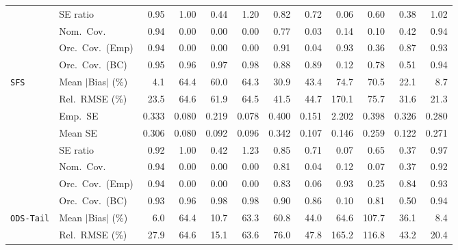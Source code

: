 \begin{landscape}
\begin{longtable}{llrrrrrrrrrr}
 & SE ratio & \cellcolor{rankthree}0.95 & \cellcolor{rankone}1.00 & 0.44 & 1.20 & 0.82 & 0.72 & 0.06 & 0.60 & 0.38 & \cellcolor{ranktwo}1.02 \\
 & Nom.\ Cov. & \cellcolor{rankone}0.94 & 0.00 & 0.00 & 0.00 & \cellcolor{ranktwo}0.77 & 0.03 & 0.14 & 0.10 & \cellcolor{rankthree}0.42 & \cellcolor{rankone}0.94 \\
 & Orc.\ Cov.\ (Emp) & \cellcolor{rankone}0.94 & 0.00 & 0.00 & 0.00 & \cellcolor{rankthree}0.91 & 0.04 & \cellcolor{ranktwo}0.93 & 0.36 & 0.87 & \cellcolor{ranktwo}0.93 \\
 & Orc.\ Cov.\ (BC) & \cellcolor{rankone}0.95 & \cellcolor{ranktwo}0.96 & \cellcolor{rankthree}0.97 & 0.98 & 0.88 & 0.89 & 0.12 & 0.78 & 0.51 & \cellcolor{ranktwo}0.94 \\
\addlinespace[2pt]
\quad \texttt{SFS} & Mean $|$Bias$|$ (\%) & \cellcolor{rankone}4.1 & 64.4 & 60.0 & 64.3 & 30.9 & 43.4 & 74.7 & 70.5 & \cellcolor{rankthree}22.1 & \cellcolor{ranktwo}8.7 \\
 & Rel.\ RMSE (\%) & \cellcolor{ranktwo}23.5 & 64.6 & 61.9 & 64.5 & 41.5 & 44.7 & 170.1 & 75.7 & \cellcolor{rankthree}31.6 & \cellcolor{rankone}21.3 \\
 & Emp.\ SE & 0.333 & 0.080 & 0.219 & 0.078 & 0.400 & 0.151 & 2.202 & 0.398 & 0.326 & 0.280 \\
 & Mean SE & 0.306 & 0.080 & 0.092 & 0.096 & 0.342 & 0.107 & 0.146 & 0.259 & 0.122 & 0.271 \\
 & SE ratio & \cellcolor{rankthree}0.92 & \cellcolor{rankone}1.00 & 0.42 & 1.23 & 0.85 & 0.71 & 0.07 & 0.65 & 0.37 & \cellcolor{ranktwo}0.97 \\
 & Nom.\ Cov. & \cellcolor{rankone}0.94 & 0.00 & 0.00 & 0.00 & \cellcolor{rankthree}0.81 & 0.04 & 0.12 & 0.07 & 0.37 & \cellcolor{ranktwo}0.92 \\
 & Orc.\ Cov.\ (Emp) & \cellcolor{rankone}0.94 & 0.00 & 0.00 & 0.00 & 0.83 & 0.06 & \cellcolor{ranktwo}0.93 & 0.25 & \cellcolor{rankthree}0.84 & \cellcolor{ranktwo}0.93 \\
 & Orc.\ Cov.\ (BC) & \cellcolor{ranktwo}0.93 & \cellcolor{rankone}0.96 & \cellcolor{rankthree}0.98 & \cellcolor{rankthree}0.98 & 0.90 & 0.86 & 0.10 & 0.81 & 0.50 & \cellcolor{rankone}0.94 \\
\addlinespace[2pt]
\quad \texttt{ODS-Tail} & Mean $|$Bias$|$ (\%) & \cellcolor{rankone}6.0 & 64.4 & \cellcolor{rankthree}10.7 & 63.3 & 60.8 & 44.0 & 64.6 & 107.7 & 36.1 & \cellcolor{ranktwo}8.4 \\
 & Rel.\ RMSE (\%) & \cellcolor{rankthree}27.9 & 64.6 & \cellcolor{rankone}15.1 & 63.6 & 76.0 & 47.8 & 165.2 & 116.8 & 43.2 & \cellcolor{ranktwo}20.4 \\

\end{longtable}
\end{landscape}
